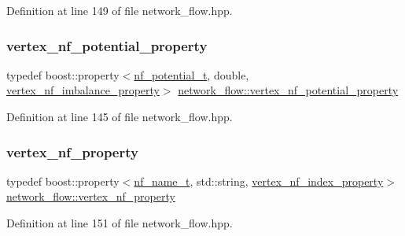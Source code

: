 Definition at line 149 of file network\+\_\+flow.\+hpp.

\mbox{\label{classnetwork__flow_a7af7fd0fcbf29616fd8f9b9ffcdd896a}} 
\subsubsection{\texorpdfstring{vertex\+\_\+nf\+\_\+potential\+\_\+property}{vertex\_nf\_potential\_property}}
{\footnotesize\ttfamily typedef boost\+::property$<$\hyperlink{structnetwork__flow_1_1nf__potential__t}{nf\+\_\+potential\+\_\+t}, double, \hyperlink{classnetwork__flow_a0a396ed01fb0e279605ea3be069c719f}{vertex\+\_\+nf\+\_\+imbalance\+\_\+property}$>$ \hyperlink{classnetwork__flow_a7af7fd0fcbf29616fd8f9b9ffcdd896a}{network\+\_\+flow\+::vertex\+\_\+nf\+\_\+potential\+\_\+property}\hspace{0.3cm}{\ttfamily [private]}}



Definition at line 145 of file network\+\_\+flow.\+hpp.

\mbox{\label{classnetwork__flow_ae9862e011ed505ae9795617b0725fa9e}} 
\subsubsection{\texorpdfstring{vertex\+\_\+nf\+\_\+property}{vertex\_nf\_property}}
{\footnotesize\ttfamily typedef boost\+::property$<$\hyperlink{structnetwork__flow_1_1nf__name__t}{nf\+\_\+name\+\_\+t}, std\+::string, \hyperlink{classnetwork__flow_a5cf2b14797e4f8b5ef2e9a83d029497c}{vertex\+\_\+nf\+\_\+index\+\_\+property}$>$ \hyperlink{classnetwork__flow_ae9862e011ed505ae9795617b0725fa9e}{network\+\_\+flow\+::vertex\+\_\+nf\+\_\+property}\hspace{0.3cm}{\ttfamily [private]}}



Definition at line 151 of file network\+\_\+flow.\+hpp.

